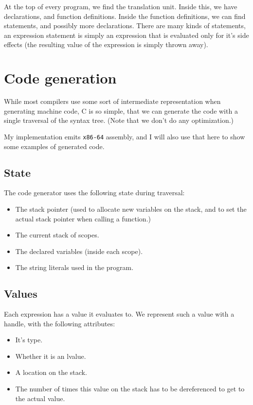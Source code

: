 \documentclass[12pt]{article}
\begin{document}
At the top of every program, we find the translation unit. Inside this, we have
declarations, and function definitions. Inside the function definitions, we can
find statements, and possibly more declarations. There are many kinds of
statements, an expression statement is simply an expression that is evaluated
only for it's side effects (the resulting value of the expression is simply
thrown away).

\section{Code generation}
While most compilers use some sort of intermediate representation when
generating machine code, C is so simple, that we can generate the code with a
single traversal of the syntax tree. (Note that we don't do any optimization.)

My implementation emits \texttt{x86-64} assembly, and I will also use that here
to show some examples of generated code.

\subsection{State}
The code generator uses the following state during traversal:
\begin{itemize}
	\item The stack pointer (used to allocate new variables on the stack,
		and to set the actual stack pointer when calling a function.)
	\item The current stack of scopes.
	\item The declared variables (inside each scope).
	\item The string literals used in the program.
\end{itemize}

\subsection{Values}
Each expression has a value it evaluates to. We represent such a value with a
handle, with the following attributes:
\begin{itemize}
	\item It's type.
	\item Whether it is an lvalue.
	\item A location on the stack.
	\item The number of times this value on the stack has to be
		dereferenced to get to the actual value.
\end{itemize}
\end{document}
